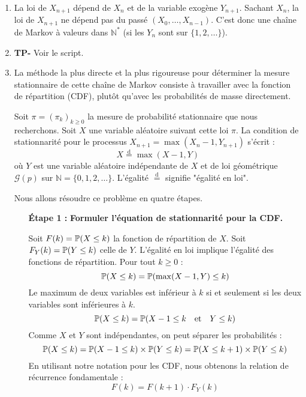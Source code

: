 \documentclass[solutions]{exercices}
\begin{document}
\begin{solution}
	\begin{enumerate}
		\item La loi de $X_{n+1}$ dépend de $X_n$ et de la variable exogène $Y_{n+1}$. Sachant $X_n$, la loi de $X_{n+1}$ ne dépend pas du passé $(X_0, \dots, X_{n-1})$. C'est donc une chaîne de Markov à valeurs dans $\mathbb{N}^*$ (si les $Y_n$ sont sur $\{1, 2, \dots\}$).
		\item \textbf{TP-} Voir le script.
		\item La méthode la plus directe et la plus rigoureuse pour déterminer la mesure stationnaire de cette chaîne de Markov consiste à travailler avec la fonction de répartition (CDF), plutôt qu'avec les probabilités de masse directement.

		      Soit $\pi = (\pi_k)_{k \ge 0}$ la mesure de probabilité stationnaire que nous recherchons. Soit $X$ une variable aléatoire suivant cette loi $\pi$. La condition de stationnarité pour le processus $X_{n+1} = \max(X_n - 1, Y_{n+1})$ s'écrit :
		      \[
			      X \stackrel{\text{d}}{=} \max(X-1, Y)
		      \]
		      où $Y$ est une variable aléatoire indépendante de $X$ et de loi géométrique $\mathcal{G}(p)$ sur $\mathbb{N} = \{0, 1, 2, \dots\}$. L'égalité $\stackrel{\text{d}}{=}$ signifie "égalité en loi".

		      Nous allons résoudre ce problème en quatre étapes.

		      \begin{enumerate}
			      \item[\textbf{Étape 1 :}] \textbf{Formuler l'équation de stationnarité pour la CDF.}

			            Soit $F(k) = \P(X \le k)$ la fonction de répartition de $X$. Soit $F_Y(k) = \P(Y \le k)$ celle de $Y$.
			            L'égalité en loi implique l'égalité des fonctions de répartition. Pour tout $k \ge 0$ :
			            \[
				            \P(X \le k) = \P(\max(X-1, Y) \le k)
			            \]
			            Le maximum de deux variables est inférieur à $k$ si et seulement si les deux variables sont inférieures à $k$.
			            \[
				            \P(X \le k) = \P(X-1 \le k \quad \text{et} \quad Y \le k)
			            \]
			            Comme $X$ et $Y$ sont indépendantes, on peut séparer les probabilités :
			            \[
				            \P(X \le k) = \P(X-1 \le k) \times \P(Y \le k) = \P(X \le k+1) \times \P(Y \le k)
			            \]
			            En utilisant notre notation pour les CDF, nous obtenons la relation de récurrence fondamentale :
			            \[
				            F(k) = F(k+1) \cdot F_Y(k)
			            \]


\end{enumerate}
\end{enumerate}
\end{solution}
\end{document}
